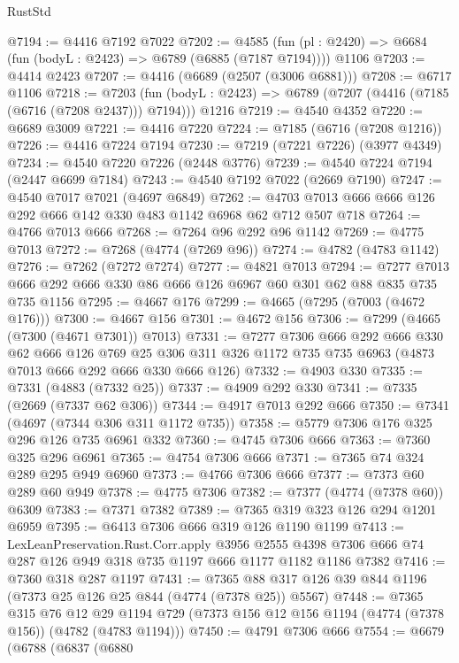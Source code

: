 \begin{lexlean}{RustStd}
\begin{coremodule}
@7194 := @4416 @7192 @7022
@7202 := @4585
    (fun (pl : @2420) => @6684 (fun (bodyL : @2423) => @6789 (@6885 (@7187 @7194))))
    @1106
@7203 := @4414 @2423
@7207 := @4416 (@6689 (@2507 (@3006 @6881)))
@7208 := @6717 @1106
@7218 := @7203
    (fun (bodyL : @2423) => @6789 (@7207 (@4416 (@7185 (@6716 (@7208 @2437))) @7194)))
    @1216
@7219 := @4540 @4352
@7220 := @6689 @3009
@7221 := @4416 @7220
@7224 := @7185 (@6716 (@7208 @1216))
@7226 := @4416 @7224 @7194
@7230 := @7219 (@7221 @7226) (@3977 @4349)
@7234 := @4540 @7220 @7226 (@2448 @3776)
@7239 := @4540 @7224 @7194 (@2447 @6699 @7184)
@7243 := @4540 @7192 @7022 (@2669 @7190)
@7247 := @4540 @7017 @7021 (@4697 @6849)
@7262 := @4703 @7013 @666 @666 @126 @292 @666 @142 @330 @483 @1142 @6968 @62 @712 @507 @718
@7264 := @4766 @7013 @666
@7268 := @7264 @96 @292 @96 @1142
@7269 := @4775 @7013
@7272 := @7268 (@4774 (@7269 @96))
@7274 := @4782 (@4783 @1142)
@7276 := @7262 (@7272 @7274)
@7277 := @4821 @7013
@7294 := @7277 @7013 @666 @292 @666 @330 @86 @666 @126 @6967 @60 @301 @62 @88 @835 @735 @735 @1156
@7295 := @4667 @176
@7299 := @4665 (@7295 (@7003 (@4672 @176)))
@7300 := @4667 @156
@7301 := @4672 @156
@7306 := @7299 (@4665 (@7300 (@4671 @7301)) @7013)
@7331 := @7277
    @7306
    @666
    @292
    @666
    @330
    @62
    @666
    @126
    @769
    @25
    @306
    @311
    @326
    @1172
    @735
    @735
    @6963
    (@4873 @7013 @666 @292 @666 @330 @666 @126)
@7332 := @4903 @330
@7335 := @7331 (@4883 (@7332 @25))
@7337 := @4909 @292 @330
@7341 := @7335 (@2669 (@7337 @62 @306))
@7344 := @4917 @7013 @292 @666
@7350 := @7341 (@4697 (@7344 @306 @311 @1172 @735))
@7358 := @5779 @7306 @176 @325 @296 @126 @735 @6961 @332
@7360 := @4745 @7306 @666
@7363 := @7360 @325 @296 @6961
@7365 := @4754 @7306 @666
@7371 := @7365 @74 @324 @289 @295 @949 @6960
@7373 := @4766 @7306 @666
@7377 := @7373 @60 @289 @60 @949
@7378 := @4775 @7306
@7382 := @7377 (@4774 (@7378 @60)) @6309
@7383 := @7371 @7382
@7389 := @7365 @319 @323 @126 @294 @1201 @6959
@7395 := @6413 @7306 @666 @319 @126 @1190 @1199
@7413 := LexLeanPreservation.Rust.Corr.apply
    @3956
    @2555
    @4398
    @7306
    @666
    @74
    @287
    @126
    @949
    @318
    @735
    @1197
    @666
    @1177
    @1182
    @1186
    @7382
@7416 := @7360 @318 @287 @1197
@7431 := @7365 @88 @317 @126 @39 @844 @1196 (@7373 @25 @126 @25 @844 (@4774 (@7378 @25)) @5567)
@7448 := @7365
    @315
    @76
    @12
    @29
    @1194
    @729
    (@7373 @156 @12 @156 @1194 (@4774 (@7378 @156)) (@4782 (@4783 @1194)))
@7450 := @4791 @7306 @666
@7554 := @6679
    (@6788
      (@6837
        (@6880

\end{coremodule}
\end{lexlean}
